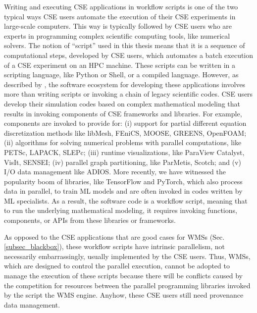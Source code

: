 Writing and executing CSE applications in workflow scripts is one of the two typical ways CSE users automate the execution of their CSE experiments in large-scale computers.
This way is typically followed by CSE users who are experts in programming complex scientific computing tools, like numerical solvers.
The notion of ``script'' used in this thesis means that it is a sequence of computational steps, developed by CSE users, which automates a batch execution of a CSE experiment on an HPC machine. These scripts can be written in a scripting language, like Python or Shell, or a compiled language.
However, as described by \citet{Silva2018Capturing}, the software ecosystem for developing these applications involves
more than writing scripts or invoking a chain of legacy scientific
codes.
CSE users develop their simulation codes based on
complex mathematical modeling that results in invoking components of CSE
frameworks and libraries. For example, components are invoked to provide
for: (i) support for partial different equation discretization methods like libMesh, FEniCS,
MOOSE, GREENS, OpenFOAM; (ii) algorithms for solving numerical
problems with parallel computations, like PETSc, LAPACK, SLEPc; (iii)
runtime visualizations, like ParaView Catalyst, VisIt, SENSEI; (iv)
parallel graph partitioning, like ParMetis, Scotch; and (v) I/O data
management like ADIOS.
More recently, we have witnessed the popularity boom of  libraries, like TensorFlow and PyTorch, which also process data in parallel, to \eg{} train ML models and are often invoked in codes written by ML specialists.
As a result, the software code is a workflow script, meaning that to run the underlying mathematical modeling, it requires
invoking functions, components, or APIs from these libraries or
frameworks.


As opposed to the CSE applications that are good cases for WMSs (Sec. \ref{subsec_blackbox}), these workflow scripts have intrinsic parallelism, not necessarily embarrassingly, usually implemented by the CSE users.
Thus, WMSs, which are designed to control the parallel execution, cannot be adopted to manage the execution of these scripts because there will be conflicts caused by the competition for resources between the parallel programming libraries invoked by the script the WMS engine. Anyhow, these CSE users still need provenance data management.

